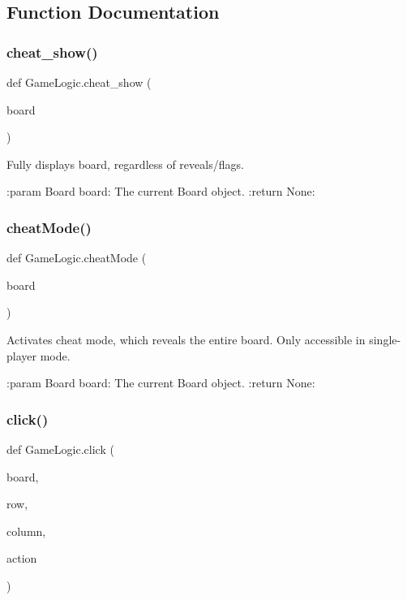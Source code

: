 \subsection{Function Documentation}
\mbox{\label{namespace_game_logic_ab23e4dd8920efb5dc428f599388dbc70}} 
\subsubsection{\texorpdfstring{cheat\+\_\+show()}{cheat\_show()}}
{\footnotesize\ttfamily def Game\+Logic.\+cheat\+\_\+show (\begin{DoxyParamCaption}\item[{}]{board }\end{DoxyParamCaption})}

\begin{DoxyVerb}Fully displays board, regardless of reveals/flags.

:param Board board: The current Board object.
:return None:
\end{DoxyVerb}
 \mbox{\label{namespace_game_logic_ac701e0d880a5e8c09baf395c2f5d2a19}} 
\subsubsection{\texorpdfstring{cheat\+Mode()}{cheatMode()}}
{\footnotesize\ttfamily def Game\+Logic.\+cheat\+Mode (\begin{DoxyParamCaption}\item[{}]{board }\end{DoxyParamCaption})}

\begin{DoxyVerb}Activates cheat mode, which reveals the entire board. Only accessible in single-player mode.

:param Board board: The current Board object.
:return None:
\end{DoxyVerb}
 \mbox{\label{namespace_game_logic_a8565813a63f94dd1e8325cbc3b2015bb}} 
\subsubsection{\texorpdfstring{click()}{click()}}
{\footnotesize\ttfamily def Game\+Logic.\+click (\begin{DoxyParamCaption}\item[{}]{board,  }\item[{}]{row,  }\item[{}]{column,  }\item[{}]{action }\end{DoxyParamCaption})}

